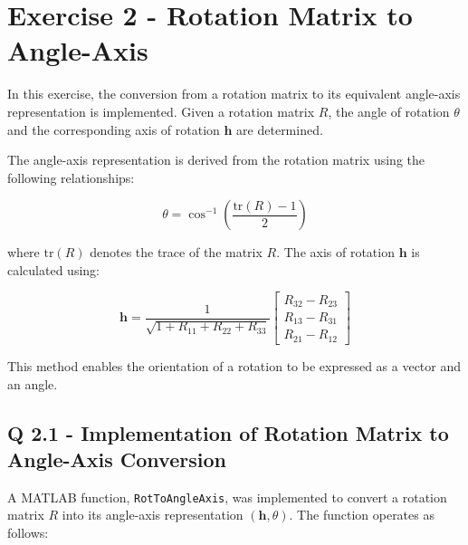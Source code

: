 \section{Exercise 2 - Rotation Matrix to Angle-Axis} \label{P2}

In this exercise, the conversion from a rotation matrix to its equivalent angle-axis representation is implemented. Given a rotation matrix \( R \), the angle of rotation \( \theta \) and the corresponding axis of rotation \( \mathbf{h} \) are determined.

The angle-axis representation is derived from the rotation matrix using the following relationships:

\begin{equation} \label{angle_axis}
\theta = \cos^{-1} \left( \frac{\text{tr}(R) - 1}{2} \right)
\end{equation}

where \( \text{tr}(R) \) denotes the trace of the matrix \( R \). The axis of rotation \( \mathbf{h} \) is calculated using:

\begin{equation} \label{axis}
\mathbf{h} = \frac{1}{\sqrt{1 + R_{11} + R_{22} + R_{33}}} \begin{bmatrix}
R_{32} - R_{23} \\
R_{13} - R_{31} \\
R_{21} - R_{12}
\end{bmatrix}
\end{equation}

This method enables the orientation of a rotation to be expressed as a vector and an angle.

\subsection{Q 2.1 - Implementation of Rotation Matrix to Angle-Axis Conversion}

A MATLAB function, \texttt{RotToAngleAxis}, was implemented to convert a rotation matrix \( R \) into its angle-axis representation \( (\mathbf{h}, \theta) \). The function operates as follows:

